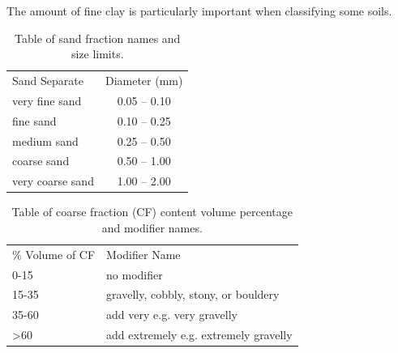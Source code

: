 \documentclass{article}
\begin{document}
The amount of fine clay is particularly important when classifying some soils.
    
\begin{table}[!htbp]
\centering
\caption{Table of sand fraction names and size limits.}
\label{tab:sandfractions}
\begin{tabular}{|lc|}
\hline
Sand Separate    & Diameter (mm) \\ \hhline{|==|}
very fine sand   & 0.05 – 0.10   \\
fine sand        & 0.10 – 0.25   \\
medium sand      & 0.25 – 0.50   \\
coarse sand      & 0.50 – 1.00   \\
very coarse sand & 1.00 – 2.00   \\
\hline
\end{tabular}
\end{table}

    
\begin{table}[!htbp]
\centering
\caption{Table of coarse fraction (CF) content volume percentage and modifier names.}
\label{tab:coarsefractionvolume}
\begin{tabular}{|ll|}
\hline
\% Volume of CF  &  Modifier Name                        \\  \hhline{|==|}
0-15             & no modifier                           \\
15-35            & gravelly, cobbly, stony, or bouldery  \\
35-60            & add very e.g. very gravelly           \\
\textgreater{}60 & add extremely e.g. extremely gravelly \\
\hline
\end{tabular}
\end{table}

    
\end{document}
